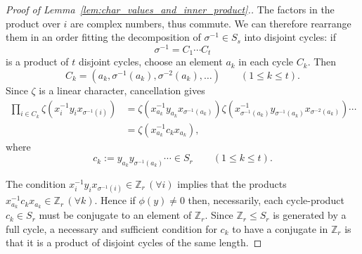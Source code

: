 \documentclass[ALCO,published]{cedram}
\def\ZZ{{\mathbb Z}}
\begin{document}
\begin{proof}[Proof of  Lemma~\ref{lem:char_values_and_inner_product}.]
    The factors in the product over $i$ are complex numbers, thus commute. We can therefore rearrange them in an order fitting the decomposition of $\sigma^{-1} \in S_s$ into disjoint cycles: if
    \[
        \sigma^{-1} = C_1 \cdots C_t
    \]
    is a product of $t$ disjoint cycles, choose an element $a_k$ in each cycle $C_k$. Then
    \[
        C_k = (a_k, \sigma^{-1}(a_k), \sigma^{-2}(a_k), \ldots)
        \qquad (1 \le k \le t).
    \]
    Since $\zeta$ is a linear character, cancellation gives
    \begin{align*}
        \prod_{i \in C_k} \zeta(x_i^{-1}y_ix_{\sigma^{-1}(i)})
        &= \zeta(x_{a_k}^{-1}y_{a_k}x_{\sigma^{-1}({a_k})})
        \zeta(x_{\sigma^{-1}({a_k})}^{-1}y_{\sigma^{-1}({a_k})}x_{\sigma^{-2}(a_k)})
        \cdots \\
        &= \zeta(x_{a_k}^{-1}c_kx_{a_k}),
    \end{align*}
    where
    \[
        c_k := y_{a_k} y_{\sigma^{-1}({a_k})} \cdots \in S_r
        \qquad (1 \le k \le t).
    \]
		
    The condition $x_i^{-1}y_ix_{\sigma^{-1}(i)} \in \ZZ_r\, (\forall i)$ implies that the products $x_{a_k}^{-1}c_kx_{a_k}\in \ZZ_r\, (\forall k)$. 
    Hence if $\phi(y) \ne 0$ then, necessarily, each cycle-product $c_k \in S_r$ must be conjugate to an element of $\ZZ_r$.
    Since $\ZZ_r \le S_r$ is generated by a full cycle, 
    a necessary and sufficient condition for $c_k$ to have a conjugate in $\ZZ_r$ is that it is a product of disjoint cycles of the same length.


\end{proof}
\end{document}
